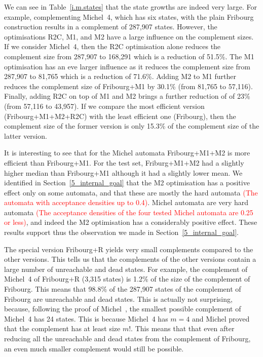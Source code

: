 We can see in Table~\ref{i.m.states} that the state growths are indeed very large. For example, complementing Michel~4, which has six states, with the plain Fribourg construction results in a complement of 287,907 states. However, the optimisations R2C, M1, and M2 have a large influence on the complement sizes. If we consider Michel~4, then the R2C optimisation alone reduces the complement size from 287,907 to 168,291 which is a reduction of 51.5\%. The M1 optimisation has an eve larger influence as it reduces the complement size from 287,907 to 81,765 which is a reduction of 71.6\%. Adding M2 to M1 further reduces the complement size of Fribourg+M1 by 30.1\% (from 81,765 to 57,116). Finally, adding R2C on top of M1 and M2 brings a further reduction of of 23\% (from 57,116 to 43,957). If we compare the most efficient version (Fribourg+M1+M2+R2C) with the least efficient one (Fribourg), then the complement size of the former version is only 15.3\% of the complement size of the latter version.

It is interesting to see that for the Michel automata Fribourg+M1+M2 is more efficient than Fribourg+M1. For the \goal{} test set, Friburg+M1+M2 had a slightly higher median than Fribourg+M1 although it had a slightly lower mean. We identified in Section~\ref{5_internal_goal} that the M2 optimisation has a positive effect only on some automata, and that these are mostly the hard automata \textcolor{red}{(The automata with acceptance densities up to 0.4)}. Michel automata are very hard automata \textcolor{red}{(The acceptance densities of the four tested Michel automata are 0.25 or less)}, and indeed the M2 optimisation has a considerably positive effect. These results support thus the observation we made in Section~\ref{5_internal_goal}.

The special version Fribourg+R yields very small complements compared to the other versions. This tells us that the complements of the other versions contain a large number of unreachable and dead states. For example, the complement of Michel~4 of Fribourg+R (3,315 states) is 1.2\% of the size of the complement of Fribourg. This means that 98.8\% of the 287,907 states of the complement of Fribourg are unreachable and dead states. This is actually not surprising, because, following the proof of Michel~\cite{michel1988}\cite{1996_thomas}, the smallest possible complement of Michel~4 has 24 states. This is because Michel~4 has $m=4$ and Michel proved that the complement has at least size $m!$. This means that that even after reducing all the unreachable and dead states from the complement of Fribourg, an even much smaller complement would still be possible.

